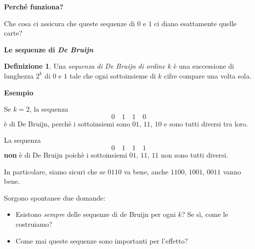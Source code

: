 \documentclass[8pt]{beamer}
\theoremstyle{plain}
\theoremstyle{definition}
\newtheorem{defin}[thm]{Definizione}
\begin{document}
\begin{frame}
\begin{center}
\textbf{Perché funziona?}
 
\bigskip
\bigskip

Che cosa ci assicura che queste sequenze di $0$ e $1$ ci diano esattamente quelle carte?
% 
% 
% 
\end{center}
\end{frame}






\begin{frame}
\begin{center}
\textbf{Le sequenze di \textit{De Bruijn}}

\bigskip

\begin{defin}
Una \emph{sequenza di De Bruijn di ordine $k$} è una successione di lunghezza $2^k$ di $0$ e $1$ tale che ogni sottoinsieme di $k$ cifre compare una volta sola.
\end{defin}


\bigskip

\textbf{Esempio}

\bigskip

Se $k=2$, la sequenza
$$0\quad 1\quad 1\quad 0$$
è di De Bruijn, perchè i sottoinsiemi sono $01$, $11$, $10$ e sono tutti diversi tra loro.

\bigskip
\bigskip

La sequenza
$$0\quad 1\quad 1\quad 1$$ 
\textbf{non} è di De Bruijn poichè i sottoinsiemi $01$, $11$, $11$ non sono tutti diversi.

\bigskip

In particolare, siamo sicuri che se $0110$ va bene, anche $1100$, $1001$, $0011$ vanno bene. 

\end{center}
\end{frame}


\begin{frame}
\begin{center}

Sorgono spontanee due domande:

\bigskip
\bigskip

\begin{itemize}
\item Esistono \emph{sempre} delle sequenze di de Bruijn per ogni $k$? Se sì, come le costruiamo?
\item Come mai queste sequenze sono importanti per l'effetto?
\end{itemize}

\end{center}
\end{frame}
\end{document}
